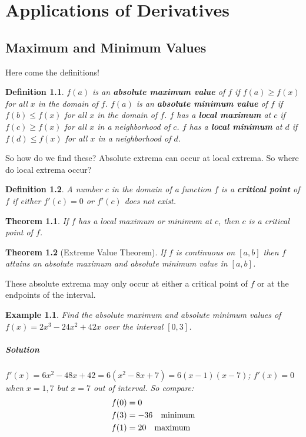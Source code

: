 \documentclass[letterpaper, 11pt, openany]{book}
\theoremstyle{mytheoremstyle}
\newtheorem{theorem}{Theorem}[section]
\newtheorem{definition}{Definition}[section]
\theoremstyle{myexamplestyle}
\newtheorem{example}{Example}[section]
\newenvironment{solution}{\paragraph{\sffamily \smaller \fontseries{b}\selectfont Solution}}{\hfill\faSquare}
\begin{document}
\newpage\thispagestyle{firstofchapter}
\chapter{Applications of Derivatives}
\section{Maximum and Minimum Values}
\setcounter{figure}{0}

Here come the definitions!

\begin{definition}\label{d:extrema}
    \(f(a)\) is an \textbf{absolute maximum value} of \(f\) if \(f(a) \geq f(x)\) for all \(x\) in the domain of \(f\). \(f(a)\) is an \textbf{absolute minimum value} of \(f\) if \(f(b) \leq f(x)\) for all \(x\) in the domain of \(f\). \(f\) has a \textbf{local maximum} at \(c\) if \(f(c) \geq f(x)\) for all \(x\) in a neighborhood of \(c\). \(f\) has a \textbf{local minimum} at \(d\) if \(f(d) \leq f(x)\) for all \(x\) in a neighborhood of \(d\). 
\end{definition}

So how do we find these? Absolute extrema can occur at local extrema. So where do local extrema occur?

\begin{definition}\label{d:critical-point}
    A number \(c\) in the domain of a function \(f\) is a \textbf{critical point} of \(f\) if either \(f'(c) = 0\) or \(f'(c)\) does not exist.
\end{definition}

\begin{theorem}\label{t:local-extrema-conditions}
    If \(f\) has a local maximum or minimum at \(c\), then \(c\) is a critical point of \(f\).
\end{theorem}

\begin{theorem}[Extreme Value Theorem]\label{t:extreme-value}
    If \(f\) is continuous on \([a,b]\) then \(f\) attains an absolute maximum and absolute minimum value in \([a,b]\).
\end{theorem}

These absolute extrema may only occur at either a critical point of \(f\) or at the endpoints of the interval.

\begin{example}\label{absmaxmin-poly}
    Find the absolute maximum and absolute minimum values of $f(x) = 2x^{3} - 24x^{2} + 42x$ over the interval $[0, 3]$.
    \begin{solution}
        $f'(x) = 6x^{2} - 48x + 42 = 6(x^{2} - 8x + 7) = 6(x-1)(x-7)$; $f'(x) = 0$ when $x=1, 7$ but $x=7$ out of interval. So compare:
        \begin{align*}
            f(0) &= 0\\
            f(3) &= -36\text{\quad minimum}\\
            f(1) &= 20\text{\quad maximum}
        \end{align*}
    \end{solution}
\end{example}
\end{document}
